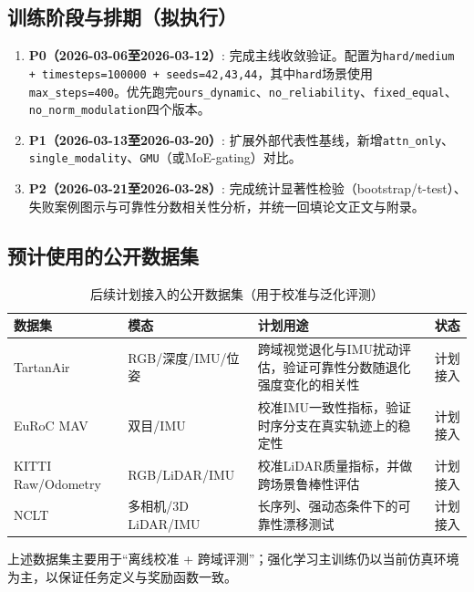 \subsection{训练阶段与排期（拟执行）}
\begin{enumerate}
    \item \textbf{P0（2026-03-06至2026-03-12）}: 完成主线收敛验证。配置为\texttt{hard/medium + timesteps=100000 + seeds=42,43,44}，其中\texttt{hard}场景使用\texttt{max\_steps=400}。优先跑完\texttt{ours\_dynamic}、\texttt{no\_reliability}、\texttt{fixed\_equal}、\texttt{no\_norm\_modulation}四个版本。
    \item \textbf{P1（2026-03-13至2026-03-20）}: 扩展外部代表性基线，新增\texttt{attn\_only}、\texttt{single\_modality}、\texttt{GMU}（或MoE-gating）对比。
    \item \textbf{P2（2026-03-21至2026-03-28）}: 完成统计显著性检验（bootstrap/t-test）、失败案例图示与可靠性分数相关性分析，并统一回填论文正文与附录。
\end{enumerate}

\subsection{预计使用的公开数据集}
\begin{table}[h!]
    \centering
    \caption{后续计划接入的公开数据集（用于校准与泛化评测）}
    \label{tab-student-plan-datasets}
    \footnotesize
    \begin{tabular}{p{2.3cm}p{2.1cm}p{5.0cm}p{1.6cm}}
        \toprule
        数据集 & 模态 & 计划用途 & 状态 \\
        \midrule
        TartanAir & RGB/深度/IMU/位姿 & 跨域视觉退化与IMU扰动评估，验证可靠性分数随退化强度变化的相关性 & 计划接入 \\
        EuRoC MAV & 双目/IMU & 校准IMU一致性指标，验证时序分支在真实轨迹上的稳定性 & 计划接入 \\
        KITTI Raw/Odometry & RGB/LiDAR/IMU & 校准LiDAR质量指标，并做跨场景鲁棒性评估 & 计划接入 \\
        NCLT & 多相机/3D LiDAR/IMU & 长序列、强动态条件下的可靠性漂移测试 & 计划接入 \\
        \bottomrule
    \end{tabular}
\end{table}

上述数据集主要用于“离线校准 + 跨域评测”；强化学习主训练仍以当前仿真环境为主，以保证任务定义与奖励函数一致。

